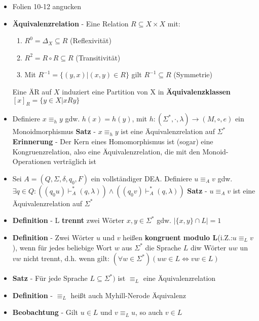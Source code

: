 \documentclass[12pt, a4paper]{article}
\begin{document}
\begin{itemize}
		\item Folien 10-12 angucken
		
		\item \textbf{Äquivalenzrelation} - Eine Relation $R\subseteq X\times X$ mit:
		\begin{enumerate}
			\item $R^{0}=\Delta_{X}\subseteq R$ (Reflexivität)
			\item $R^{2}=R\circ R\subseteq R$ (Transitivität)
			\item Mit $R^{-1}=\{(y,x)|(x,y)\in R\}$ gilt $R^{-1}\subseteq R$ (Symmetrie)
		\end{enumerate}
		Eine ÄR auf $X$ induziert eine Partition von X in \textbf{Äquivalenzklassen} $[x]_{R}=\{y\in X|xRy\}$
		
		\item Definiere $x\equiv_{h} y$ gdw. $h(x)=h(y)$, mit $h:(\Sigma^{*},\cdot,\lambda)\rightarrow(M,\circ,e)$ ein Monoidmorphismus
		\subitem \textbf{Satz} - $x\equiv_{h} y$ ist eine Äquivalenzrelation auf $\Sigma^{*}$
		\subitem \textbf{Erinnerung} - Der Kern eines Homomorphismus ist (sogar) eine Kongruenzrelation, also eine Äquivalenzrelation, die mit den Monoid-Operationen verträglich ist
		
		\item Sei $A=(Q,\Sigma,\delta,q_{0},F)$ ein vollständiger DEA. Definiere $u\equiv_{A}v$ gdw. $\exists q\in Q:((q_{0}u)\vdash^{*}_{A}(q,\lambda))\wedge((q_{0}v)\vdash^{*}_{A}(q,\lambda))$
		\subitem \textbf{Satz} - $u\equiv_{A}v$ ist eine Äquivalenzrelation auf $\Sigma^{*}$
		
		
		\item \textbf{Definition} - L \textbf{trennt} zwei Wörter $x,y\in\Sigma^{*}$ gdw. $|\{x,y\}\cap L|=1$
		
		\item \textbf{Definition} - Zwei Wörter $u$ und $v$ heißen \textbf{kongruent modulo L}(i.Z.:$u\equiv_{L}v$), wenn für jedes beliebige Wort $w$ aus $\Sigma^{*}$ die Sprache $L$ diw Wörter $uw$ un $vw$ nicht trennt, d.h. wenn gilt: $(\forall w\in\Sigma^{*})(uw\in L\Leftrightarrow vw\in L)$
		
		\item \textbf{Satz} - Für jede Sprache $L\subseteq\Sigma^{*})$ ist $\equiv_{L}$ eine Äquivalenzrelation
		
		\item \textbf{Definition} - $\equiv_{L}$ heißt auch Myhill-Nerode Äquivalenz
		
		\item \textbf{Beobachtung} - Gilt $u\in L$ und $v\equiv_{L}u$, so auch $v\in L$
		

\end{itemize}
\end{document}
